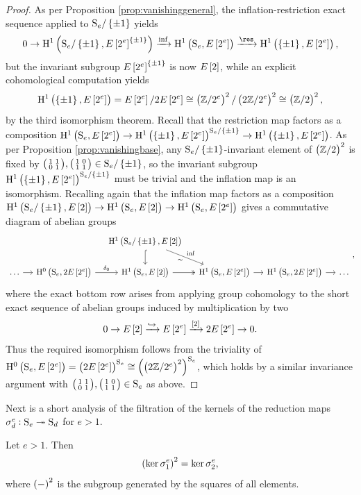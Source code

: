 \begin{proof}
As per Proposition \ref{prop:vanishinggeneral}, the inflation-restriction exact sequence applied to $ \S_e / \cbr{\pm 1} $ yields
$$ 0 \to \H^1\br{\S_e / \cbr{\pm 1}, E\sbr{2^e}^{\cbr{\pm 1}}} \xrightarrow{\inf} \HE[2^e]{\S_e} \xrightarrow{\res} \HE[2^e]{\cbr{\pm 1}}, $$
but the invariant subgroup $ E\sbr{2^e}^{\cbr{\pm 1}} $ is now $ E\sbr{2} $, while an explicit cohomological computation yields
$$ \HE[2^e]{\cbr{\pm 1}} = E\sbr{2^e} / 2E\sbr{2^e} \cong \br{\ZZ / 2^e}^2 / \br{2\ZZ / 2^e}^2 \cong \br{\ZZ / 2}^2, $$
by the third isomorphism theorem. Recall that the restriction map factors as a composition $ \HE[2^e]{\S_e} \to \HE[2^e]{\cbr{\pm 1}}^{\S_e / \cbr{\pm 1}} \to \HE[2^e]{\cbr{\pm 1}} $. As per Proposition \ref{prop:vanishingbase}, any $ \S_e / \cbr{\pm 1} $-invariant element of $ \br{\ZZ / 2}^2 $ is fixed by $ \twobytwosmall{1}{1}{0}{1}, \twobytwosmall{1}{0}{1}{1} \in \S_e / \cbr{\pm 1} $, so the invariant subgroup $ \HE[2^e]{\cbr{\pm 1}}^{\S_e / \cbr{\pm 1}} $ must be trivial and the inflation map is an isomorphism. Recalling again that the inflation map factors as a composition $ \HE[2]{\S_e / \cbr{\pm 1}} \to \HE[2]{\S_e} \to \HE[2^e]{\S_e} $ gives a commutative diagram of abelian groups
$$
\begin{tikzcd}[column sep=small]
& & \HE[2]{\S_e / \cbr{\pm 1}} \arrow[hookrightarrow]{d} \arrow{dr}{\inf}[swap]{\sim} & & & \\
\dots \arrow{r} & \H^0\br{\S_e, 2E\sbr{2^e}} \arrow{r}{\delta_0} & \HE[2]{\S_e} \arrow[twoheadrightarrow]{r} & \HE[2^e]{\S_e} \arrow{r} & \H^1\br{\S_e, 2E\sbr{2^e}} \arrow{r} & \dots
\end{tikzcd},
$$
where the exact bottom row arises from applying group cohomology to the short exact sequence of abelian groups induced by multiplication by two
$$ 0 \to E\sbr{2} \xrightarrow{\hookrightarrow} E\sbr{2^e} \xrightarrow{\sbr{2}} 2E\sbr{2^e} \to 0. $$
Thus the required isomorphism follows from the triviality of $ \H^0\br{\S_e, E\sbr{2^e}} = \br{2E\sbr{2^e}}^{\S_e} \cong \br{\br{2\ZZ / 2^e}^2}^{\S_e} $, which holds by a similar invariance argument with $ \twobytwosmall{1}{1}{0}{1}, \twobytwosmall{1}{0}{1}{1} \in \S_e $ as above.
\end{proof}

Next is a short analysis of the filtration of the kernels of the reduction maps $ \sigma_d^e : \S_e \twoheadrightarrow \S_d $ for $ e > 1 $.

\begin{lemma}
\label{lem:reductionkernel}
Let $ e > 1 $. Then
$$ \br{\ker \sigma_1^e}^2 = \ker \sigma_2^e, $$
where $ \br{-}^2 $ is the subgroup generated by the squares of all elements.
\end{lemma}

